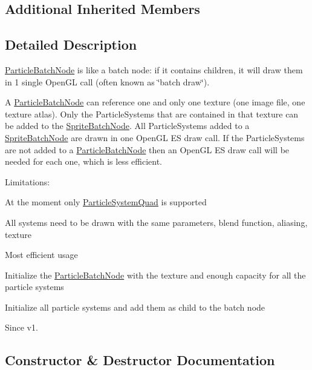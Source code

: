 \subsection*{Additional Inherited Members}


\subsection{Detailed Description}
\hyperlink{classParticleBatchNode}{Particle\+Batch\+Node} is like a batch node\+: if it contains children, it will draw them in 1 single Open\+GL call (often known as \char`\"{}batch draw\char`\"{}). 

A \hyperlink{classParticleBatchNode}{Particle\+Batch\+Node} can reference one and only one texture (one image file, one texture atlas). Only the Particle\+Systems that are contained in that texture can be added to the \hyperlink{classSpriteBatchNode}{Sprite\+Batch\+Node}. All Particle\+Systems added to a \hyperlink{classSpriteBatchNode}{Sprite\+Batch\+Node} are drawn in one Open\+GL ES draw call. If the Particle\+Systems are not added to a \hyperlink{classParticleBatchNode}{Particle\+Batch\+Node} then an Open\+GL ES draw call will be needed for each one, which is less efficient.

Limitations\+:
\begin{DoxyItemize}
\item At the moment only \hyperlink{classParticleSystemQuad}{Particle\+System\+Quad} is supported
\item All systems need to be drawn with the same parameters, blend function, aliasing, texture
\end{DoxyItemize}

Most efficient usage
\begin{DoxyItemize}
\item Initialize the \hyperlink{classParticleBatchNode}{Particle\+Batch\+Node} with the texture and enough capacity for all the particle systems
\item Initialize all particle systems and add them as child to the batch node \begin{DoxySince}{Since}
v1. 
\end{DoxySince}

\end{DoxyItemize}

\subsection{Constructor \& Destructor Documentation}
\mbox{\label{classParticleBatchNode_a81f606154458d85a20bef213e1d825ff}} 
